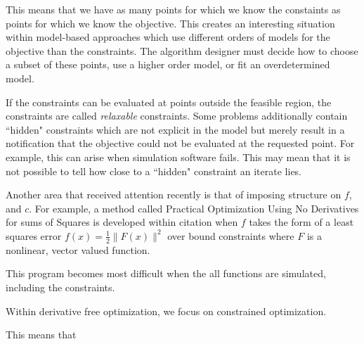 







This means that we have as many points for which we know the constaints as points for which we know the objective.
This creates an interesting situation within model-based approaches which use different orders of models for the objective than the constraints.
The algorithm designer must decide how to choose a subset of these points, use a higher order model, or fit an overdetermined model.

If the constraints can be evaluated at points outside the feasible region, the constraints are called \emph{relaxable} constraints.
Some problems additionally contain ``hidden" constraints which are not explicit in the model but merely result in a notification that the objective could not be evaluated at the requested point.
For example, this can arise when simulation software fails.
This may mean that it is not possible to tell how close to a ``hidden" constraint an iterate lies.


Another area that received attention recently is that of imposing structure on $f$, and $c$.
For example, a method called Practical Optimization Using No Derivatives for sums of Squares
is developed within \color{red}citation\color{black} %
when $f$ takes the form of a least squares error
$f(x) = \frac 1 2 \|F(x)\|^2$ over bound constraints where $F$ is a nonlinear, vector valued function.


This program becomes most difficult when the all functions are simulated, including the constraints.




Within derivative free optimization, we focus on constrained optimization.


This means that 







